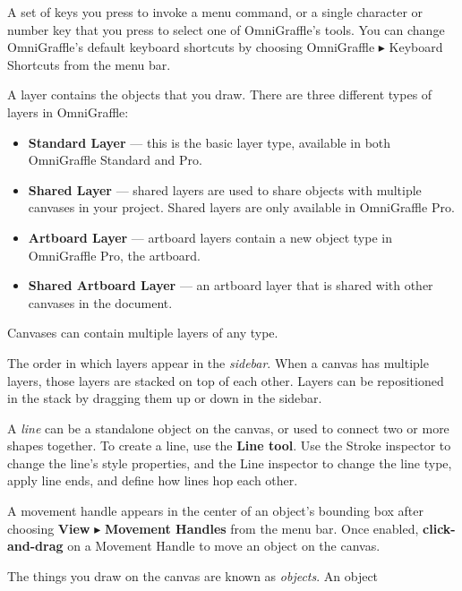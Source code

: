 \documentclass[../main.tex]{subfiles}
\begin{document}
\begin{description}[
      style=nextline,
    ]
  \item[Keyboard Shortcut] A set of keys you press to invoke a menu command, or a single
    character or number
    key that you press to select one of OmniGraffle's tools. You can change OmniGraffle's
    default keyboard
    shortcuts by choosing OmniGraffle $\blacktriangleright$ Keyboard Shortcuts from the menu
    bar.
  \item[Layer] A layer contains the objects that you draw. There are three different types of
    layers in OmniGraffle:
    \begin{itemize}[
          leftmargin=3em,
        ]
      \item \textbf{Standard Layer} — this is the basic layer type, available in both
        OmniGraffle
        Standard and Pro.
      \item \textbf{Shared Layer} — shared layers are used to share objects with multiple
        canvases in your
        project. Shared layers are only available in OmniGraffle Pro.
      \item \textbf{Artboard Layer} — artboard layers contain a new object type in OmniGraffle
        Pro, the artboard.
      \item \textbf{Shared Artboard Layer} — an artboard layer that is shared with other
        canvases in the document.
    \end{itemize}
    Canvases can contain multiple layers of any type.
  \item[Layer Stack] The order in which layers appear in the \textit{sidebar}. When a canvas has
    multiple
    layers, those layers are stacked on top of each other. Layers can be repositioned in the
    stack by
    dragging them up or down in the sidebar.
  \item[Line] A \textit{line} can be a standalone object on the canvas, or used to connect two
    or more shapes
    together. To create a line, use the \textbf{Line tool}. Use the Stroke inspector to change
    the line's
    style properties, and the Line inspector to change the line type, apply line ends, and
    define how lines
    hop each other.
  \item[Movement Handle] A movement handle appears in the center of an object's bounding box
    after choosing
    \textbf{View} $\blacktriangleright$ \textbf{Movement Handles} from the menu bar. Once
    enabled,
    \textbf{click-and-drag} on a Movement Handle to move an object on the canvas.
  \item[Object/Shape] The things you draw on the canvas are known as \textit{objects}. An object

\end{description}
\end{document}
